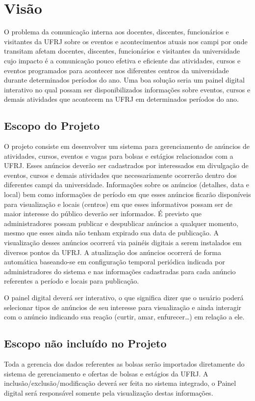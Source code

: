 \documentclass[a4paper, 12pt]{article}
\begin{document}
\section{Visão}
O problema da comunicação interna aos docentes, discentes, funcionários e visitantes da UFRJ sobre os eventos e acontecimentos atuais nos campi por onde transitam afetam docentes, discentes, funcionários e visitantes da
universidade cujo impacto é a comunicação pouco efetiva e eficiente das atividades, cursos e eventos programados para
acontecer nos diferentes centros da universidade durante determinados períodos do ano. Uma boa solução seria um painel digital interativo no qual possam ser disponibilizados informações sobre eventos, cursos e demais atividades que acontecem na UFRJ em determinados períodos do ano.

\subsection{Escopo do Projeto}
O projeto consiste em desenvolver um sistema para gerenciamento de
anúncios de atividades, cursos, eventos e vagas para bolsas e estágios relacionados
com a UFRJ. Esses anúncios deverão ser cadastrados por interessados em divulgação
de eventos, cursos e demais atividades que necessariamente ocorrerão dentro dos
diferentes campi da universidade. Informações sobre os anúncios (detalhes, data e
local) bem como informações de período em que esses anúncios ficarão disponíveis
para visualização e locais (centros) em que esses informativos possam ser de maior
interesse do público deverão ser informados. É previsto que administradores possam
publicar e despublicar anúncios a qualquer momento, mesmo que esses ainda não
tenham expirado sua data de publicação. A visualização desses anúncios ocorrerá via
painéis digitais a serem instalados em diversos pontos da UFRJ. A atualização dos
anúncios ocorrerá de forma automática baseando-se em configuração temporal
periódica indicada por administradores do sistema e nas informações cadastradas
para cada anúncio referentes a período e locais para publicação.

O painel digital deverá ser interativo, o que significa dizer que o usuário
poderá selecionar tipos de anúncios de seu interesse para visualização e ainda
interagir com o anúncio indicando sua reação (curtir, amar, enfurecer…) em relação a
ele.
\subsection{Escopo não incluído no Projeto}
Toda a gerencia dos dados referentes as bolsas serão importados diretamente do sistema de gerenciamento e ofertas de bolsas e estágios da UFRJ. A inclusão/exclusão/modificação deverá ser feita no sistema integrado, o Painel digital será responsável somente pela visualização destas informações.
\newpage
\end{document}
